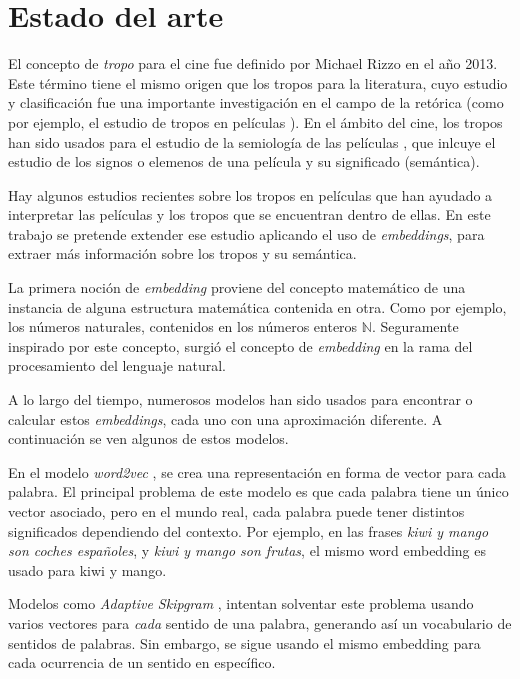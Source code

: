 \chapter{Estado del arte}

El concepto de \emph{tropo} para el cine fue definido por Michael Rizzo \cite{rizzo2013art} en el año 2013. Este término
tiene el mismo origen que los tropos para la literatura, cuyo estudio y clasificación fue una importante investigación en el
campo de la retórica (como por ejemplo, el estudio de tropos en películas \cite{nelson1998tropes}). En el ámbito del cine,
los tropos han sido usados para el estudio de la semiología de las películas \cite{howtoreadafilm}, que inlcuye el estudio
de los signos o elemenos de una película y su significado (semántica).

Hay algunos estudios recientes sobre los tropos en películas \cite{garcia2018overview} que han ayudado a interpretar las
películas y los tropos que se encuentran dentro de ellas. En este trabajo se pretende extender ese estudio aplicando el uso
de \emph{embeddings}, para extraer más información sobre los tropos y su semántica.

La primera noción de \textit{embedding} proviene del concepto matemático de una instancia de alguna
estructura matemática contenida en otra. Como por ejemplo, los números naturales, contenidos en los números enteros
$\mathbb{N}$. Seguramente inspirado por este concepto, surgió el concepto de \textit{embedding} en la rama del procesamiento
del lenguaje natural.

A lo largo del tiempo, numerosos modelos han sido usados para encontrar o calcular estos \textit{embeddings}, cada uno
con una aproximación diferente. A continuación se ven algunos de estos modelos.

En el modelo \emph{word2vec} \cite{word2vec:1} \cite{word2vec:2}, se crea una representación
en forma de vector para cada palabra. El principal problema de este modelo es que cada palabra tiene un único vector asociado,
pero en el mundo real, cada palabra puede tener distintos significados dependiendo del contexto.
Por ejemplo, en las frases \emph{kiwi y mango son coches españoles}, y \emph{kiwi y mango son frutas},
el mismo word embedding es usado para kiwi y mango.

Modelos como \emph{Adaptive Skipgram} \cite{adaptiveskipgram}, intentan solventar este problema usando
varios vectores para \emph{cada} sentido de una palabra, generando así un vocabulario de sentidos de palabras.
Sin embargo, se sigue usando el mismo embedding para cada ocurrencia de un sentido en específico.

